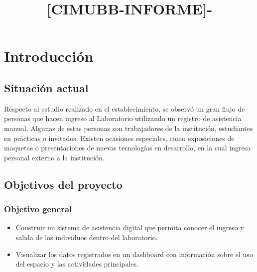 \documentclass{templateReport}
\newcounter{contador}
\begin{document}
\setcounter{contador}{1}


\title{[CIMUBB-INFORME]-\titulo}
\author{
	\integrantes
	\supervisor
}

\portada %
\margenes %

\tableofcontents %
\newpage
\listoffigures %
\listoftables %

\newpage
\section{Introducción}

\subsection{Situación actual}
Respecto al estudio realizado en el establecimiento, se observó un gran flujo de personas que hacen ingreso al Laboratorio utilizando un registro de asistencia manual. Algunas de estas personas son trabajadores de la institución, estudiantes en prácticas o invitados. Existen ocasiones especiales, como exposiciones de maquetas o presentaciones de nuevas tecnologías en desarrollo, en la cual ingresa personal externo a la institución.

\subsection{Objetivos del proyecto}
\subsubsection{Objetivo general}
\begin{itemize}
	\item Construir un sistema de asistencia digital que permita conocer el ingreso y salida de los individuos dentro del laboratorio.
	\item Visualizar los datos registrados en un dashboard con información sobre el uso del espacio y las actividades principales.
\end{itemize}
\end{document}
